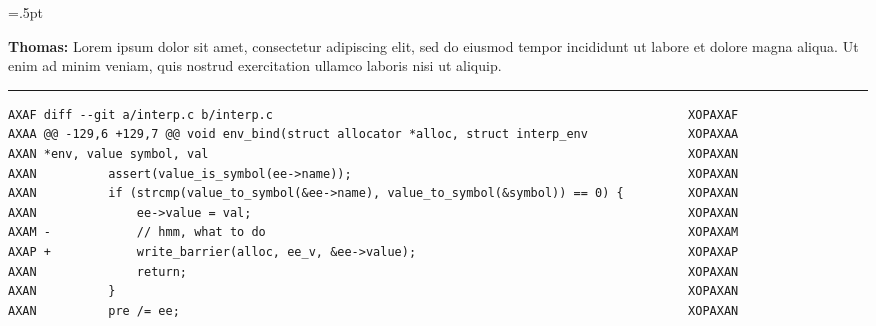 \documentclass[10pt,twoside]{article}
\newlength{\mpwidth}
\begin{document}
\lipsum[2]

\fboxsep=0pt
\fboxrule=.5pt
\begin{lrbox}{\lstbox}
\begin{minipage}{\mpwidth}
\fboxsep=3pt
\fboxrule=0pt
\begin{tcolorbox}[width=\linewidth,left skip=3pt, right skip=3pt, beforeafter skip=2pt]
\vspace{-6pt}
{\fontsize{6}{6}\selectfont
\begin{ldescription}
\item[\textbf{Thomas:}]
Lorem ipsum dolor sit amet, consectetur adipiscing elit, sed do eiusmod tempor
incididunt ut labore et dolore magna aliqua. Ut enim ad minim veniam, quis
nostrud exercitation ullamco laboris nisi ut aliquip.
\end{ldescription}}
\end{tcolorbox}
\vspace{1pt}
\hrule
\begin{lstlisting}[language=diff]
AXAF diff --git a/interp.c b/interp.c                                                          XOPAXAF
AXAA @@ -129,6 +129,7 @@ void env_bind(struct allocator *alloc, struct interp_env              XOPAXAA
AXAN *env, value symbol, val                                                                   XOPAXAN
AXAN          assert(value_is_symbol(ee->name));                                               XOPAXAN
AXAN          if (strcmp(value_to_symbol(&ee->name), value_to_symbol(&symbol)) == 0) {         XOPAXAN
AXAN              ee->value = val;                                                             XOPAXAN
AXAM -            // hmm, what to do                                                           XOPAXAM
AXAP +            write_barrier(alloc, ee_v, &ee->value);                                      XOPAXAP
AXAN              return;                                                                      XOPAXAN
AXAN          }                                                                                XOPAXAN
AXAN          pre /= ee;                                                                       XOPAXAN
\end{lstlisting}


\end{minipage}
\end{lrbox}
\end{document}
